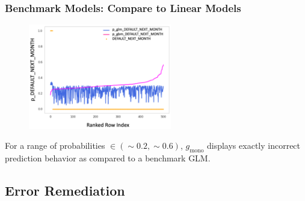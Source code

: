 \documentclass[11pt,
               aspectratio=169,
               hyperref={colorlinks}
               ]{beamer}
\begin{document}
			\begin{frame}
		
				\frametitle{\textbf{Benchmark Models}: Compare to Linear Models}
				\begin{figure}
					\begin{center}
						\includegraphics[height=130pt]{../img/benchmark.png}
					\end{center}
				\end{figure}	
				\vspace{-10pt}
				For a range of probabilities $\in  (\sim0.2, \sim0.6)$, $g_{\text{mono}}$ displays exactly incorrect prediction behavior as compared to a benchmark GLM.
			\end{frame}

		\subsection{Error Remediation}
\end{document}

